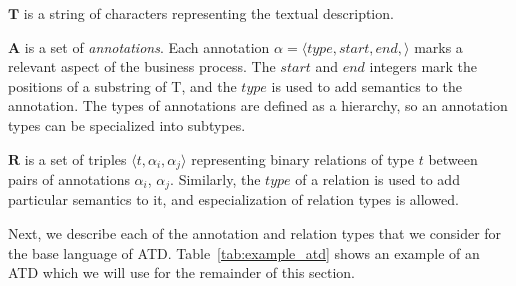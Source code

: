 
\begin{description}
\item{$\mathbf{T}$}{ is a string of characters representing the textual description.}
\item{$\mathbf{A}$}{ is a set of \emph{annotations}. Each annotation $\alpha =
    \langle type, start, end, \rangle$ marks a relevant aspect of the business
    process. The $start$ and $end$ integers mark the positions of a substring of
    T, and the $type$ is used to add semantics to the annotation. The types of
    annotations are defined as a hierarchy, so an annotation types can be specialized
    into subtypes.}
\item{$\mathbf{R}$}{ is a set of triples $\langle t, \alpha_i,
    \alpha_j \rangle$ representing binary relations of type $t$ between pairs of
    annotations $\alpha_i$, $\alpha_j$. Similarly, the $type$ of a relation is
    used to add particular semantics to it, and especialization of relation
    types is allowed.}
\end{description}

Next, we describe each of the annotation and relation types that we consider for
the base language of ATD. Table~\ref{tab:example_atd} shows an example of an
ATD which we will use for the remainder of this section.

